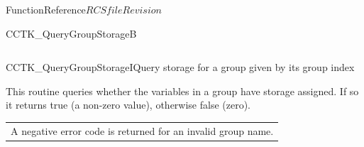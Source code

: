 \begin{cactuspart}{FunctionReference}{$RCSfile$}{$Revision$}
\begin{CCTKFunc}{CCTK\_QueryGroupStorageB}{}
\label{CCTK-QueryGroupStorageB}
\showcargs
\begin{params}
\end{params}
\begin{discussion}
\end{discussion}
\begin{examples}
\begin{tabular}{@{}p{3cm}cp{11cm}}
\end{tabular}
\end{examples}
\begin{errorcodes}
\end{errorcodes}
\end{CCTKFunc}

\begin{CCTKFunc}{CCTK\_QueryGroupStorageI}{Query storage for a group given by its group index}
\label{CCTK-QueryGroupStorageI}
\showargs
\begin{params}
\end{params}
\begin{discussion}
This routine queries whether the variables in a group have storage assigned.
If so it returns true (a non-zero value), otherwise false (zero).
\end{discussion}
\begin{errorcodes}
\begin{tabular}{l}
A negative error code is returned for an invalid group name.
\end{tabular}
\end{errorcodes}
\end{CCTKFunc}








\end{cactuspart}
